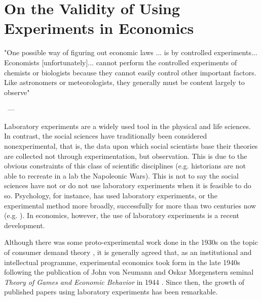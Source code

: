 \documentclass[12pt]{article}
\let\oldquote\quote
\let\endoldquote\endquote
\renewenvironment{quote}[2][]
{\if\relax\detokenize{#1}\relax
	\def\quoteauthor{#2}%
	\else
	\def\quoteauthor{#2~---~#1}%
	\fi
	\oldquote}
{\par\nobreak\smallskip\hfill\quoteauthor%
	\endoldquote\addvspace{\bigskipamount}}
\begin{document}
%
%
%

\section{On the Validity of Using Experiments in Economics}

\begin{quote}{\cite{Samuelson1985}}
"One possible way of figuring out economic laws ... is by controlled experiments... Economists [unfortunately]... cannot perform the controlled experiments of chemists or biologists because they cannot easily control other important factors. Like astronomers or meteorologists, they generally must be content largely to observe"
\end{quote}

Laboratory experiments are a widely used tool in the physical and life sciences. In contrast, the social sciences have traditionally been considered nonexperimental, that is, the data upon which social scientists base their theories are collected not through experimentation, but observation. This is due to the obvious constraints of this class of scientific disciplines (e.g. historians are not able to recreate in a lab the Napoleonic Wars). This is not to say the social sciences have not or do not use laboratory experiments when it is feasible to do so. Psychology, for instance, has used laboratory experiments, or the experimental method more broadly, successfully for more than two centuries now (e.g. \cite{Ebbinghaus1885}). In economics, however, the use of laboratory experiments is a recent development. 

Although there was some proto-experimental work done in the 1930s on the topic of consumer demand theory \citep{Moscati2007}, it is generally agreed that, as an institutional and intellectual programme, experimental economics took form in the late 1940s following the publication of John von Neumann and Oskar Morgenstern seminal \textit{Theory of Games and Economic Behavior} in 1944 \citep{Guala2008}. Since then, the growth of published papers using laboratory experiments has been remarkable. 
\end{document}
